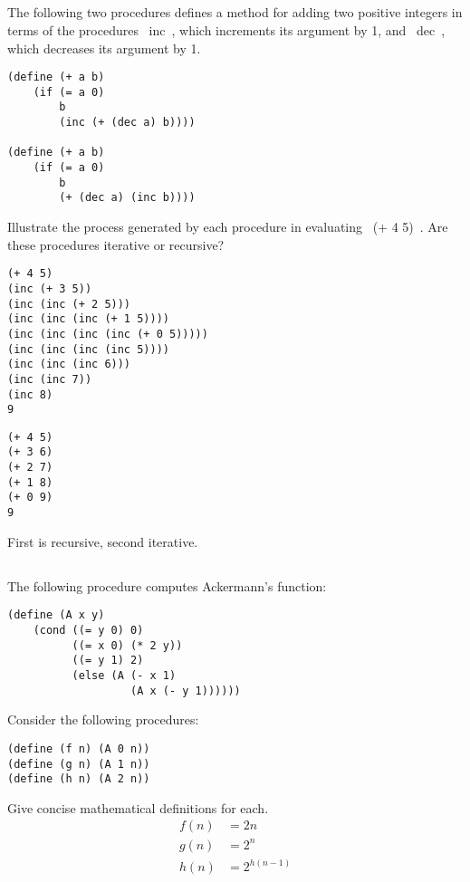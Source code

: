 \documentclass{article}
\begin{document}
\pagebreak
\subsection{}
The following two procedures defines a method for adding two positive integers in terms of the procedures ~inc~, which increments its argument by 1, and ~dec~, which decreases its argument by 1.
\begin{lstlisting}
(define (+ a b)
    (if (= a 0)
        b
        (inc (+ (dec a) b))))

(define (+ a b)
    (if (= a 0)
        b
        (+ (dec a) (inc b))))
\end{lstlisting}
Illustrate the process generated by each procedure in evaluating ~(+ 4 5)~. Are these procedures iterative or recursive?
\begin{multicols}{2}
\begin{lstlisting}
(+ 4 5)
(inc (+ 3 5))
(inc (inc (+ 2 5)))
(inc (inc (inc (+ 1 5))))
(inc (inc (inc (inc (+ 0 5)))))
(inc (inc (inc (inc 5))))
(inc (inc (inc 6)))
(inc (inc 7))
(inc 8)
9
\end{lstlisting}
\columnbreak
\begin{lstlisting}
(+ 4 5)
(+ 3 6)
(+ 2 7)
(+ 1 8)
(+ 0 9)
9
\end{lstlisting}
\end{multicols}
First is recursive, second iterative.

\subsection{}
The following procedure computes Ackermann's function:
\begin{lstlisting}
(define (A x y)
    (cond ((= y 0) 0)
          ((= x 0) (* 2 y))
          ((= y 1) 2)
          (else (A (- x 1)
                   (A x (- y 1))))))
\end{lstlisting}
Consider the following procedures:
\begin{lstlisting}
(define (f n) (A 0 n))
(define (g n) (A 1 n))
(define (h n) (A 2 n))
\end{lstlisting}
Give concise mathematical definitions for each.
\begin{align}
    f(n) &= 2n \\
    g(n) &= 2^n \\
    h(n) &= 2^{h(n-1)}
\end{align}

\pagebreak
\end{document}
